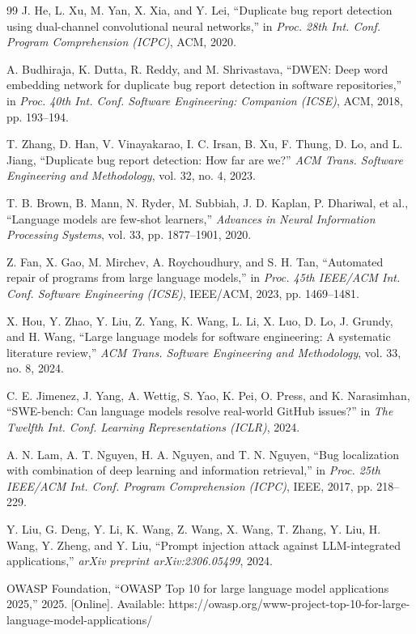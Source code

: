 \begin{thebibliography}{99}
J. He, L. Xu, M. Yan, X. Xia, and Y. Lei, ``Duplicate bug report detection using dual-channel convolutional neural networks,'' in \textit{Proc. 28th Int. Conf. Program Comprehension (ICPC)}, ACM, 2020.

A. Budhiraja, K. Dutta, R. Reddy, and M. Shrivastava, ``DWEN: Deep word embedding network for duplicate bug report detection in software repositories,'' in \textit{Proc. 40th Int. Conf. Software Engineering: Companion (ICSE)}, ACM, 2018, pp. 193--194.

T. Zhang, D. Han, V. Vinayakarao, I. C. Irsan, B. Xu, F. Thung, D. Lo, and L. Jiang, ``Duplicate bug report detection: How far are we?'' \textit{ACM Trans. Software Engineering and Methodology}, vol. 32, no. 4, 2023.

T. B. Brown, B. Mann, N. Ryder, M. Subbiah, J. D. Kaplan, P. Dhariwal, et al., ``Language models are few-shot learners,'' \textit{Advances in Neural Information Processing Systems}, vol. 33, pp. 1877--1901, 2020.

Z. Fan, X. Gao, M. Mirchev, A. Roychoudhury, and S. H. Tan, ``Automated repair of programs from large language models,'' in \textit{Proc. 45th IEEE/ACM Int. Conf. Software Engineering (ICSE)}, IEEE/ACM, 2023, pp. 1469--1481.

X. Hou, Y. Zhao, Y. Liu, Z. Yang, K. Wang, L. Li, X. Luo, D. Lo, J. Grundy, and H. Wang, ``Large language models for software engineering: A systematic literature review,'' \textit{ACM Trans. Software Engineering and Methodology}, vol. 33, no. 8, 2024.

C. E. Jimenez, J. Yang, A. Wettig, S. Yao, K. Pei, O. Press, and K. Narasimhan, ``SWE-bench: Can language models resolve real-world GitHub issues?'' in \textit{The Twelfth Int. Conf. Learning Representations (ICLR)}, 2024.

A. N. Lam, A. T. Nguyen, H. A. Nguyen, and T. N. Nguyen, ``Bug localization with combination of deep learning and information retrieval,'' in \textit{Proc. 25th IEEE/ACM Int. Conf. Program Comprehension (ICPC)}, IEEE, 2017, pp. 218--229.

Y. Liu, G. Deng, Y. Li, K. Wang, Z. Wang, X. Wang, T. Zhang, Y. Liu, H. Wang, Y. Zheng, and Y. Liu, ``Prompt injection attack against LLM-integrated applications,'' \textit{arXiv preprint arXiv:2306.05499}, 2024.

OWASP Foundation, ``OWASP Top 10 for large language model applications 2025,'' 2025. [Online]. Available: https://owasp.org/www-project-top-10-for-large-language-model-applications/


\end{thebibliography}
